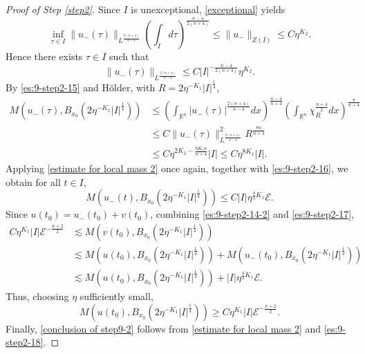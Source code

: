 \documentclass[11pt,a4paper]{article}
\numberwithin{equation}{section}
\begin{document}
\begin{proof}[Proof of Step \ref{step2}]
Since $I$ is unexceptional, \eqref{exceptional} yields
\[
\inf_{\tau \in I} \|u_{-}(\tau)\|_{L^{\frac{2(n+4)}{n-4}}} \left( \int_{I} d\tau \right)^{\frac{n-4}{2(n+4)}} \leq \|u_{-}\|_{Z(I)} \leq C\eta^{K_{2}}.
\]
Hence there exists $\tau \in I$ such that
\begin{equation}\label{es:9-step2-15}
\|u_{-}(\tau)\|_{L^{\frac{2(n+4)}{n-4}}} \leq C|I|^{-\frac{n-4}{2(n+4)}}\eta^{K_{2}}.
\end{equation}
By \eqref{es:9-step2-15} and H\"older, with $R = 2\eta^{-K_{1}}|I|^{\frac{1}{4}}$,
\begin{equation}\label{es:9-step2-16}
\begin{aligned}
M\left(u_{-}(\tau), B_{x_{0}}(2\eta^{-K_{1}}|I|^{\frac{1}{4}})\right)
&\leq \left( \int_{\mathbb{R}^{n}}|u_{-}(\tau)|^{\frac{2(n+4)}{n-4}} dx\right)^{\frac{n-4}{n+4}}
\left( \int_{\mathbb{R}^{n}}\chi^{\frac{n+4}{2}}_{R} dx\right)^{\frac{8}{n+4}} \\
&\leq C\|u_{-}(\tau)\|_{L^{\frac{2(n+4)}{n-4}}}^{2}R^{\frac{8n}{n+4}}\\
&\leq C\eta^{2K_{2}-\frac{8K_{1}n}{n+4}}|I| \leq C\eta^{8K_{1}}|I|.
\end{aligned}
\end{equation}
Applying \eqref{estimate for local mass 2} once again, together with \eqref{es:9-step2-16}, we obtain for all $t \in I$,
\begin{equation}\label{es:9-step2-17}
M\left(u_{-}(t), B_{x_{0}}(2\eta^{-K_{1}}|I|^{\frac{1}{4}})\right) \leq C|I|\eta^{\frac{4}{3}K_{1}}\mathcal{E}.
\end{equation}
Since $u(t_{0}) = u_{-}(t_{0}) + v(t_{0})$, combining \eqref{es:9-step2-14-2} and \eqref{es:9-step2-17},
\begin{align*}
C\eta^{K_{1}}|I|\mathcal{E}^{-\frac{n+2}{2}}
&\lesssim M\left(v(t_{0}), B_{x_{0}}(2\eta^{-K_{1}}|I|^{\frac{1}{4}}) \right) \\
&\lesssim M\left(u(t_{0}), B_{x_{0}}(2\eta^{-K_{1}}|I|^{\frac{1}{4}}) \right) + M\left(u_{-}(t_{0}), B_{x_{0}}(2\eta^{-K_{1}}|I|^{\frac{1}{4}}) \right) \\
&\lesssim M\left(u(t_{0}), B_{x_{0}}(2\eta^{-K_{1}}|I|^{\frac{1}{4}}) \right) + |I|\eta^{\frac{4}{3}K_{1}}\mathcal{E}.
\end{align*}
Thus, choosing $\eta$ sufficiently small,
\begin{equation}\label{es:9-step2-18}
M\left(u(t_{0}), B_{x_{0}}(2\eta^{-K_{1}}|I|^{\frac{1}{4}})\right) \geq C\eta^{K_{1}}|I|\mathcal{E}^{-\frac{n+2}{2}}.
\end{equation}
Finally, \eqref{conclusion of step9-2} follows from \eqref{estimate for local mass 2} and \eqref{es:9-step2-18}.
\end{proof}
\end{document}
